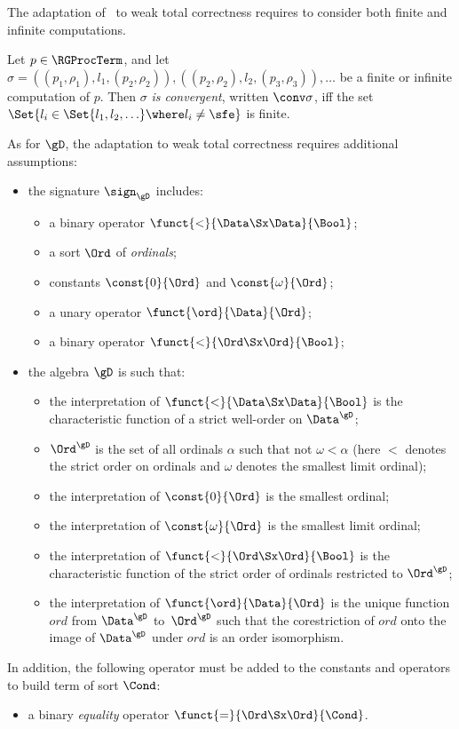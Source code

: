 \documentclass[runningheads]{llncs}
\begin{document}
The adaptation of \RG\ to weak total correctness requires to consider 
both finite and infinite computations.

Let $p \in \RGProcTerm$, and let
$\sigma = 
 ((p_1,\rho_1), l_1, (p_2,\rho_2)), 
 ((p_2,\rho_2), l_2, (p_3,\rho_3)), \ldots$
be a finite or infinite computation of $p$.
Then $\sigma$ \emph{is convergent}, written $\conv \sigma$, iff 
the set $\Set{l_i \in \Set{l_1,l_2,\ldots} \where l_i \neq \sfe}$ is 
finite.

As for $\gD$, the adaptation to weak total correctness requires 
additional assumptions:
\begin{itemize}
\item
the signature $\sign_\gD$ includes:
\begin{itemize}
\item
a binary operator $\funct{<}{\Data \Sx \Data}{\Bool}$;
\item
a sort $\Ord$ of \emph{ordinals};
\item
constants $\const{0}{\Ord}$ and $\const{\omega}{\Ord}$;
\item
a unary operator $\funct{\ord}{\Data}{\Ord}$;
\item
a binary operator $\funct{<}{\Ord \Sx \Ord}{\Bool}$;
\end{itemize}
\item
the algebra $\gD$ is such that:
\begin{itemize}
\item
the interpretation of $\funct{<}{\Data \Sx \Data}{\Bool}$ is the
characteristic function of a strict well-order on $\Data^\gD$;
\item
$\Ord^\gD$ is the set of all ordinals $\alpha$ such that
not $\omega < \alpha$ (here $<$ denotes the strict order on ordinals and 
$\omega$ denotes the smallest limit ordinal);
\item
the interpretation of $\const{0}{\Ord}$ is the smallest ordinal;
\item
the interpretation of $\const{\omega}{\Ord}$ is the smallest limit 
ordinal;
\item
the interpretation of $\funct{<}{\Ord \Sx \Ord}{\Bool}$ is the
characteristic function of the strict order of ordinals restricted to
$\Ord^\gD$;
\item
the interpretation of $\funct{\ord}{\Data}{\Ord}$ is the unique function 
$\mathit{ord}$ from $\Data^\gD$ to~$\Ord^\gD$ such that the 
corestriction of $\mathit{ord}$ onto the image of $\Data^\gD$ under 
$\mathit{ord}$ is an order isomorphism.
\end{itemize}
\end{itemize}
In addition, the following operator must be added to the constants and 
operators to build term of sort $\Cond$:
\begin{itemize}
\item
a binary \emph{equality} operator $\funct{=}{\Ord \Sx \Ord}{\Cond}$.
\end{itemize}
\end{document}
